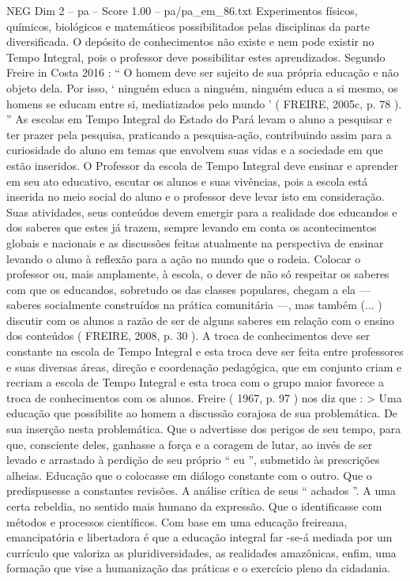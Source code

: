 \begin{textsample}{NEG Dim 2 – pa – Score 1.00 – pa/pa\_em\_86.txt}
Experimentos físicos, químicos, biológicos e matemáticos possibilitados pelas disciplinas da parte diversificada.
O depósito de conhecimentos não existe e nem pode existir no Tempo Integral, pois o professor deve possibilitar estes aprendizados.
Segundo Freire in Costa 2016 : “ O homem deve ser sujeito de sua própria educação e não objeto dela.
Por isso, ‘ ninguém educa a ninguém, ninguém educa a si mesmo, os homens se educam entre si, mediatizados pelo mundo ’ ( FREIRE, 2005c, p. 78 ). ” As escolas em Tempo Integral do Estado do Pará levam o aluno a pesquisar e ter prazer pela pesquisa, praticando a pesquisa-ação, contribuindo assim para a curiosidade do aluno em temas que envolvem suas vidas e a sociedade em que estão inseridos.
O Professor da escola de Tempo Integral deve ensinar e aprender em seu ato educativo, escutar os alunos e suas vivências, pois a escola está inserida no meio social do aluno e o professor deve levar isto em consideração.
Suas atividades, seus conteúdos devem emergir para a realidade dos educandos e dos saberes que estes já trazem, sempre levando em conta os acontecimentos globais e nacionais e as discussões feitas atualmente na perspectiva de ensinar levando o aluno à reflexão para a ação no mundo que o rodeia.
Colocar o professor ou, mais amplamente, à escola, o dever de não só respeitar os saberes com que os educandos, sobretudo os das classes populares, chegam a ela — saberes socialmente construídos na prática comunitária —, mas também (... ) discutir com os alunos a razão de ser de alguns saberes em relação com o ensino dos conteúdos ( FREIRE, 2008, p. 30 ).
A troca de conhecimentos deve ser constante na escola de Tempo Integral e esta troca deve ser feita entre professores e suas diversas áreas, direção e coordenação pedagógica, que em conjunto criam e recriam a escola de Tempo Integral e esta troca com o grupo maior favorece a troca de conhecimentos com os alunos.
Freire ( 1967, p. 97 ) nos diz que : > Uma educação que possibilite ao homem a discussão corajosa de sua problemática.
De sua inserção nesta problemática.
Que o advertisse dos perigos de seu tempo, para que, consciente deles, ganhasse a força e a coragem de lutar, ao invés de ser levado e arrastado à perdição de seu próprio “ eu ”, submetido às prescrições alheias.
Educação que o colocasse em diálogo constante com o outro.
Que o predispusesse a constantes revisões.
A análise crítica de seus “ achados ”.
A uma certa rebeldia, no sentido mais humano da expressão.
Que o identificasse com métodos e processos científicos.
Com base em uma educação freireana, emancipatória e libertadora é que a educação integral far -se-á mediada por um currículo que valoriza as pluridiversidades, as realidades amazônicas, enfim, uma formação que vise a humanização das práticas e o exercício pleno da cidadania.

\end{textsample}
